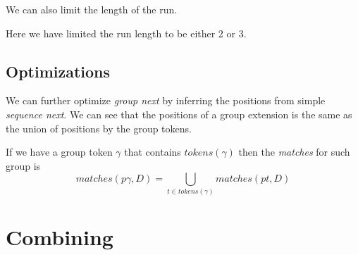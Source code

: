 \begin{figure}[H]
	
\end{figure}

We can also limit the length of the run.

\begin{figure}[H]
	
\end{figure}

Here we have limited the run length to be either 2 or 3.

\subsection{Optimizations}

We can further optimize \emph{group next} by inferring the positions from simple \emph{sequence next}. We can see that the positions of a group extension is the same as the union of positions by the group tokens.

If we have a group token $\gamma$ that contains $tokens(\gamma)$ then the \emph{matches} for such group is $$matches(p\gamma, D) = \bigcup_{t \in tokens(\gamma)} matches(pt, D) $$


\section{Combining}

